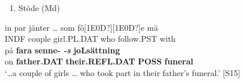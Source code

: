 \begin{enumerate} %
\item 
Stöde (Md)

\end{enumerate} %
\ea\label{}
\gll in  par  jänter  …  som  fô[1E0D?][1E0D?]e  mä\\


INDF  couple  girl.PL.DAT    who  follow.PST  with\\ %


\ea\label{}
\gll på  \textbf{fara} \textbf{senne-}\textbf{\textit{  }}\textbf{\textit{\nobreakdash-s}} \textbf{joLsättning} \\


on  \textbf{father.DAT} \textbf{their.REFL.DAT} \textbf{POSS} \textbf{funeral} \\ %


‘…a couple of girls … who took part in their father’s funeral.’ [S15]
\z

